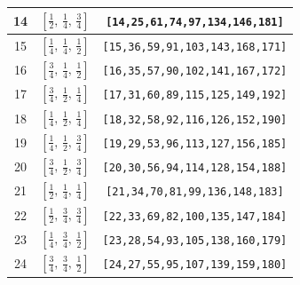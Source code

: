 \documentclass[fleqn,8pt]{jsarticle}
\begin{document}
\begin{longtable}{ccc}
14 & $\left[ \frac{1}{2},\, \frac{1}{4},\, \frac{3}{4} \right]$ & {\tt [14,25,61,74,97,134,146,181]} \\ \hline
15 & $\left[ \frac{1}{4},\, \frac{1}{4},\, \frac{1}{2} \right]$ & {\tt [15,36,59,91,103,143,168,171]} \\ \hline
16 & $\left[ \frac{3}{4},\, \frac{1}{4},\, \frac{1}{2} \right]$ & {\tt [16,35,57,90,102,141,167,172]} \\ \hline
17 & $\left[ \frac{3}{4},\, \frac{1}{2},\, \frac{1}{4} \right]$ & {\tt [17,31,60,89,115,125,149,192]} \\ \hline
18 & $\left[ \frac{1}{4},\, \frac{1}{2},\, \frac{1}{4} \right]$ & {\tt [18,32,58,92,116,126,152,190]} \\ \hline
19 & $\left[ \frac{1}{4},\, \frac{1}{2},\, \frac{3}{4} \right]$ & {\tt [19,29,53,96,113,127,156,185]} \\ \hline
20 & $\left[ \frac{3}{4},\, \frac{1}{2},\, \frac{3}{4} \right]$ & {\tt [20,30,56,94,114,128,154,188]} \\ \hline
21 & $\left[ \frac{1}{2},\, \frac{1}{4},\, \frac{1}{4} \right]$ & {\tt [21,34,70,81,99,136,148,183]} \\ \hline
22 & $\left[ \frac{1}{2},\, \frac{3}{4},\, \frac{3}{4} \right]$ & {\tt [22,33,69,82,100,135,147,184]} \\ \hline
23 & $\left[ \frac{1}{4},\, \frac{3}{4},\, \frac{1}{2} \right]$ & {\tt [23,28,54,93,105,138,160,179]} \\ \hline
24 & $\left[ \frac{3}{4},\, \frac{3}{4},\, \frac{1}{2} \right]$ & {\tt [24,27,55,95,107,139,159,180]} \\
\end{longtable}
\renewcommand{\arraystretch}{1.2}
\end{document}
